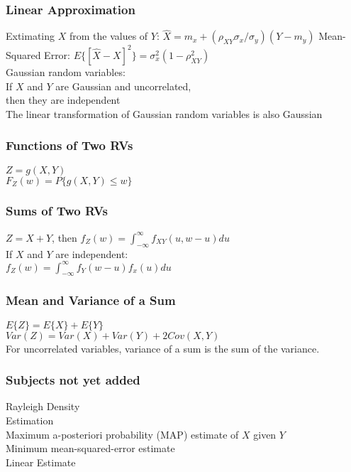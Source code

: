 \subsubsection*{Linear Approximation}
Extimating $X$ from the values of $Y$: $\hat{X}=m_x+(\rho_{XY}\sigma_x/\sigma_y)(Y-m_y)$
Mean-Squared Error: $E\{[\hat{X}-X]^2\}=\sigma_x^2(1-\rho_{XY}^2)$ \\
Gaussian random variables: \\
If $X$ and $Y$ are Gaussian and uncorrelated, \\then they are independent \\
The linear transformation of Gaussian random variables is also Gaussian 

\subsubsection*{Functions of Two RVs}
$Z=g(X,Y)$ \\
$F_Z(w)=P\{g(X,Y) \leq w \}$

\subsubsection*{Sums of Two RVs}
$Z=X+Y$, then $f_Z(w)=\int_{-\infty}^{\infty}f_{XY}(u, w-u)du$ \\
If $X$ and $Y$ are independent: \\
$f_Z(w)=\int_{-\infty}^{\infty}f_Y(w-u)f_x(u)du$


\subsubsection*{Mean and Variance of a Sum}
$E\{Z\}=E\{X\}+E\{Y\}$ \\
$Var(Z)=Var(X)+Var(Y)+2Cov(X,Y)$ \\
For uncorrelated variables, variance of a sum is the sum of the variance.


\subsubsection*{Subjects not yet added}
Rayleigh Density \\
Estimation \\
Maximum a-posteriori probability (MAP) estimate of $X$ given $Y$ \\
Minimum mean-squared-error estimate \\
Linear Estimate \\




    

